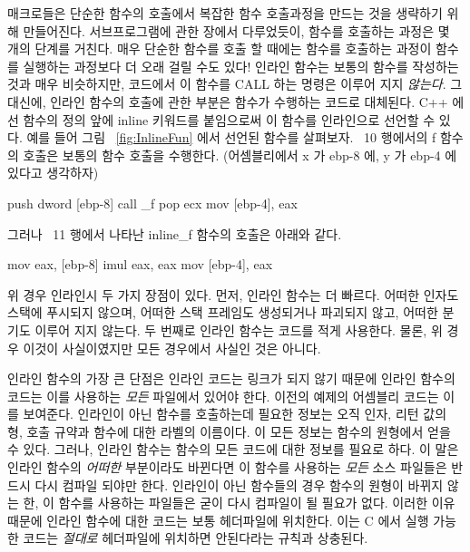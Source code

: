 매크로들은 단순한 함수의 호출에서 복잡한 함수 호출과정을 만드는 것을
생략하기 위해 만들어진다. 서브프로그램에 관한 장에서 다루었듯이, 함수를
호출하는 과정은 몇 개의 단계를 거친다. 매우 단순한 함수를 호출 할 때에는
함수를 호출하는 과정이 함수를 실행하는 과정보다 더 오래 걸릴 수도 있다!
인라인 함수는 보통의 함수를 작성하는 것과 매우 비슷하지만, 코드에서 이
함수를 {\code CALL} 하는 명령은 이루어 지지 \emph{않는다}. 그 대신에, 
인라인 함수의 호출에 관한 부분은 함수가 수행하는 코드로 대체된다. C++ 에선 
함수의 정의 앞에 {\code inline} 키워드를 붙임으로써 이 함수를 인라인으로
선언할 수 있다. 예를 들어 그림 ~\ref{fig:InlineFun} 에서 선언된 함수를
살펴보자. ~10 행에서의 {\code f} 함수의 호출은 보통의 함수 호출을 수행한다.
(어셈블리에서 {\code x} 가 {\code ebp-8} 에, {\code y} 가 {\code ebp-4} 에 있다고
생각하자) 

\begin{AsmCodeListing}
      push   dword [ebp-8]
      call   _f
      pop    ecx
      mov    [ebp-4], eax
\end{AsmCodeListing}
그러나 ~11 행에서 나타난 {\code inline\_f} 함수의 호출은 아래와 같다. 
\begin{AsmCodeListing}
      mov    eax, [ebp-8]
      imul   eax, eax
      mov    [ebp-4], eax
\end{AsmCodeListing}

위 경우 인라인시 두 가지 장점이 있다. 먼저, 인라인 함수는 더 빠르다. 어떠한 인자도
스택에 푸시되지 않으며, 어떠한 스택 프레임도 생성되거나 파괴되지 않고, 어떠한 분기도
이루어 지지 않는다. 두 번째로 인라인 함수는 코드를 적게 사용한다. 물론, 위 경우 이것이
사실이였지만 모든 경우에서 사실인 것은 아니다. 

인라인 함수의 가장 큰 단점은 인라인 코드는 링크가 되지 않기 때문에 인라인 함수의 코드는 
이를 사용하는 \emph{모든} 파일에서 있어야 한다. 이전의 예제의 어셈블리 코드는 이를 보여준다.
인라인이 아닌 함수를 호출하는데 필요한 정보는 오직 인자, 리턴 값의 형, 호출 규약과 함수에 대한
라벨의 이름이다. 이 모든 정보는 함수의 원형에서 얻을 수 있다. 그러나, 인라인 함수는 함수의
모든 코드에 대한 정보를 필요로 하다. 이 말은 인라인 함수의 \emph{어떠한} 부분이라도 바뀐다면
이 함수를 사용하는 \emph{모든} 소스 파일들은 반드시 다시 컴파일 되야만 한다. 인라인이 아닌 함수들의
경우 함수의 원형이 바뀌지 않는 한, 이 함수를 사용하는 파일들은 굳이 다시 컴파일이 될 필요가 없다. 
이러한 이유 때문에 인라인 함수에 대한 코드는 보통 헤더파일에 위치한다. 이는 C  에서 실행 가능한 코드는
\emph{절대로} 헤더파일에 위치하면 안된다라는 규칙과 상충된다. 


